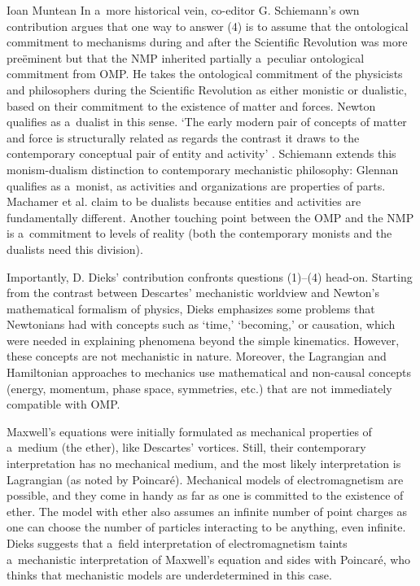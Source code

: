 \begin{recengenv}{Ioan Muntean}
In a~more historical vein, co-editor G. Schiemann's own contribution argues that one way to answer (4) is to assume that the ontological commitment to mechanisms during and after the Scientific Revolution was more preëminent but that the NMP inherited partially a~peculiar ontological commitment from OMP. He takes the ontological commitment of the physicists and philosophers during the Scientific Revolution as either monistic or dualistic, based on their commitment to the existence of matter and forces. Newton qualifies as a~dualist in this sense. ‘The early modern pair of concepts of matter and force is structurally related as regards the contrast it draws to the contemporary conceptual pair of entity and activity'
\parencite*[][p.43]{falkenburg_mechanistic_2019}. %
 Schiemann extends this monism-dualism distinction to contemporary mechanistic philosophy: Glennan qualifies as a~monist, as activities and organizations are properties of parts. Machamer et al. claim to be dualists because entities and activities are fundamentally different. Another touching point between the OMP and the NMP is a~commitment to levels of reality (both the contemporary monists and the dualists need this division).

Importantly, D. Dieks' contribution confronts questions (1)–(4) head-on. Starting from the contrast between Descartes' mechanistic worldview and Newton's mathematical formalism of physics, Dieks emphasizes some problems that Newtonians had with concepts such as ‘time,' ‘becoming,' or causation, which were needed in explaining phenomena beyond the simple kinematics. However, these concepts are not mechanistic in nature. Moreover, the Lagrangian and Hamiltonian approaches to mechanics use mathematical and non-causal concepts (energy, momentum, phase space, symmetries, etc.) that are not immediately compatible with OMP.

Maxwell's equations were initially formulated as mechanical properties of a~medium (the ether), like Descartes' vortices. Still, their contemporary interpretation has no mechanical medium, and the most likely interpretation is Lagrangian (as noted by Poincaré). Mechanical models of electromagnetism are possible, and they come in handy as far as one is committed to the existence of ether. The model with ether also assumes an infinite number of point charges as one can choose the number of particles interacting to be anything, even infinite. Dieks suggests that a~field interpretation of electromagnetism taints a~mechanistic interpretation of Maxwell's equation and sides with Poincaré, who thinks that mechanistic models are underdetermined in this case.


\end{recengenv}
